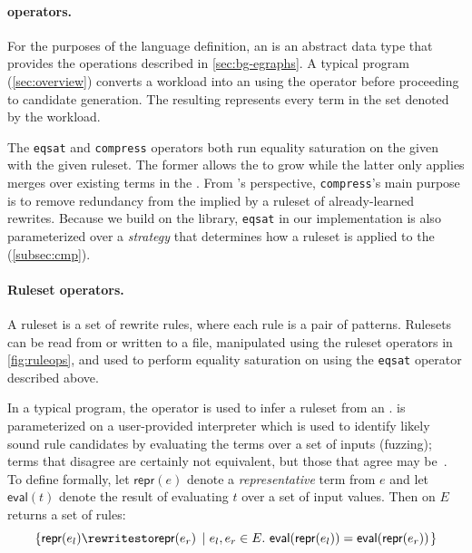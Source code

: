 \paragraph*{\Egraph operators.}
For the purposes of the \enumo language definition,
  an \egraph is an abstract data type
  that provides the operations described
  in \autoref{sec:bg-egraphs}.
A typical \enumo program (\autoref{sec:overview})
 converts a workload into an \egraph
 using the \toeggl operator
 before proceeding to candidate generation.
The resulting \egraph represents every term in the set
 denoted by the workload.

The \texttt{eqsat} and \texttt{compress} operators
 both run equality saturation on the given \egraph
 with the given ruleset.
The former allows the \egraph to grow while the latter
  only applies merges over existing terms in the \egraph.
From \enumo's perspective,
 \texttt{compress}'s main purpose is to
 remove redundancy from the \egraph implied
 by a ruleset of already-learned rewrites.
Because we build on the \egg library,
 \texttt{eqsat} in our implementation
 is also parameterized over a \emph{strategy}
 that determines how a ruleset is applied to the \egraph
 (\autoref{subsec:cmp}).

\paragraph*{Ruleset operators.}

A ruleset is a set of rewrite rules,
 where each rule is a pair of patterns.
Rulesets can be
 read from or written to a file,
 manipulated using the ruleset operators in \autoref{fig:ruleops},
 and used to perform equality saturation on \egraphs
 using the \texttt{eqsat} operator described above.

In a typical \enumo program,
 the  operator
 is used to infer a ruleset from an \egraph.
 is parameterized on a user-provided interpreter
 which is used to
 identify likely sound rule candidates
 by evaluating the terms over a set of inputs (fuzzing);
 terms that disagree are certainly not equivalent,
 but those that agree may be~\citep{ruler,bansal}.
\renewcommand{\eval}{\textsf{eval}}
\newcommand{\repr}{\textsf{repr}}
To define  formally,
 let $\repr(e)$ denote a \textit{representative} term from
 \eclass $e$
 and let $\eval(t)$ denote the result of evaluating $t$
 over a set of input values.
Then 
  on \egraph $E$ returns a set of rules:
\[
  \set{\repr(e_l) \rewritesto \repr(e_r)}{
    \text{$e_l, e_r \in E$}.\
    \eval(\repr(e_l)) = \eval(\repr(e_r))
  }
\]

